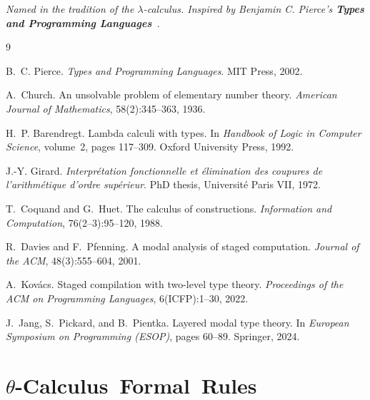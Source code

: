 \documentclass[11pt,letterpaper]{article}
\theoremstyle{definition}
\begin{document}
\bigskip
\noindent\textit{Named in the tradition of the $\lambda$-calculus. Inspired by
Benjamin C. Pierce's \textbf{Types and Programming Languages}~\cite{pierce2002}.}


\begin{thebibliography}{9}

B.~C. Pierce.
\textit{Types and Programming Languages}.
MIT Press, 2002.

A.~Church.
An unsolvable problem of elementary number theory.
\textit{American Journal of Mathematics}, 58(2):345--363, 1936.

H.~P. Barendregt.
Lambda calculi with types.
In \textit{Handbook of Logic in Computer Science}, volume~2,
pages 117--309. Oxford University Press, 1992.

J.-Y. Girard.
\textit{Interpr\'{e}tation fonctionnelle et \'{e}limination des coupures de
l'arithm\'{e}tique d'ordre sup\'{e}rieur}.
PhD thesis, Universit\'{e} Paris VII, 1972.

T.~Coquand and G.~Huet.
The calculus of constructions.
\textit{Information and Computation}, 76(2--3):95--120, 1988.

R.~Davies and F.~Pfenning.
A modal analysis of staged computation.
\textit{Journal of the ACM}, 48(3):555--604, 2001.

A.~Kov\'{a}cs.
Staged compilation with two-level type theory.
\textit{Proceedings of the ACM on Programming Languages},
6(ICFP):1--30, 2022.

J.~Jang, S.~Pickard, and B.~Pientka.
Layered modal type theory.
In \textit{European Symposium on Programming (ESOP)},
pages 60--89. Springer, 2024.

\end{thebibliography}
\fi

\appendix

\newpage

\section{$\theta$-Calculus\ Formal\ Rules}\label{sec:appendix}
\end{document}
